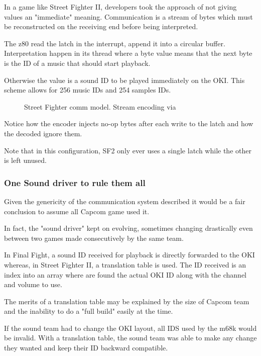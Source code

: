 In a game like Street Fighter II, developers took the approach of not giving values an "immediate" meaning. Communication is a stream of bytes which must be reconstructed on the receiving end before being interpreted.



The z80 read the latch in the interrupt, append it into a circular buffer. Interpretation happen in its  thread where a byte value  means that the next byte is the ID of a music that should start playback. 

Otherwise the value is a sound ID to be played immediately on the OKI. This scheme allows for 256 music IDs and 254 samples IDs.

 \begin{figure}[H]
\caption*{Street Fighter comm model. Stream encoding via }
\end{figure}

Notice how the encoder injects  no-op bytes after each write to the latch and how the decoded ignore them.

Note that in this configuration, SF2 only ever uses a single latch while the other is left unused.

\subsubsection{One Sound driver to rule them all}

Given the genericity of the communication system described it would be a fair conclusion to assume all Capcom game used it.

In fact, the "sound driver" kept on evolving, sometimes changing drastically even between two games made consecutively by the same team. 

In Final Fight, a sound ID received for playback is directly forwarded to the OKI whereas, in Street Fighter II, a translation table is used. The ID received is an index into an array where are found the actual OKI ID along with the channel and volume to use.

The merits of a translation table may be explained by the size of Capcom team and the inability to do a "full build" easily at the time.

If the sound team had to change the OKI layout, all IDS used by the m68k would be invalid. With a translation table, the sound team was able to make any change they wanted and keep their ID backward compatible.


